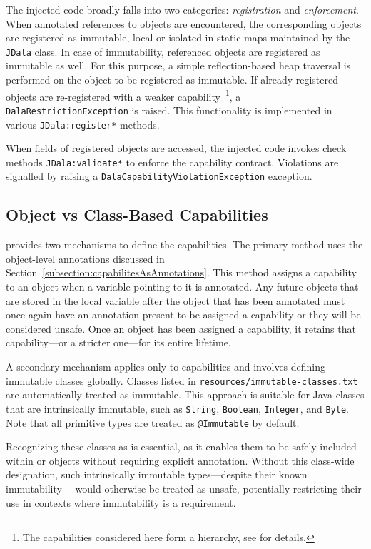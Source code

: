 The injected code broadly falls into two categories: \textit{registration} and \textit{enforcement}. When annotated references to objects are encountered, the corresponding objects are registered as immutable, local or isolated in static maps maintained by the \texttt{JDala} class. In case of immutability, referenced objects are registered as immutable as well. For this purpose, a simple reflection-based heap traversal is performed on the object to be registered as immutable.  If already registered objects are re-registered with a weaker capability~\footnote{The capabilities considered here form a hierarchy, see \cite{Dala_Paper} for details.}, a \texttt{DalaRestrictionException} is raised.  This functionality is implemented in various \texttt{JDala:register*} methods.

When fields of registered objects are accessed, the injected code invokes check methods \texttt{JDala:validate*} to enforce the capability contract. Violations are signalled by raising a \texttt{DalaCapabilityViolationException} exception.


\subsection{Object vs Class-Based Capabilities}


\jdala provides two mechanisms to define the capabilities. The primary method uses the object-level annotations discussed in Section~\ref{subsection:capabilitesAsAnnotations}. This method assigns a capability to an object when a variable pointing to it is annotated. Any future objects that are stored in the local variable after the object that has been annotated must once again have an annotation present to be assigned a capability or they will be considered unsafe.
Once an object has been assigned a capability, it retains that capability—or a stricter one—for its entire lifetime.

A secondary mechanism applies only to \Immutable capabilities and involves defining immutable classes globally. Classes listed in \texttt{resources/immutable-classes.txt} are automatically treated as immutable. This approach is suitable for Java classes that are intrinsically immutable, such as \texttt{String}, \texttt{Boolean}, \texttt{Integer}, and \texttt{Byte}. Note that all primitive types are treated as \texttt{@Immutable} by default.

Recognizing these classes as \Immutable is essential, as it enables them to be safely included within \Local or \Isolated objects without requiring explicit annotation. Without this class-wide designation, such intrinsically immutable types—despite their known immutability —would otherwise be treated as unsafe, potentially restricting their use in contexts where immutability is a requirement.

